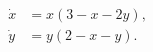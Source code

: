 \begin{align}
  \dot{x} &= x\left(3-x-2y\right), \label{eq:rabbits-vs-sheep-x} \\
  \dot{y} &= y\left(2-x-y\right). \label{eq:rabbits-vs-sheep-y}
\end{align}
